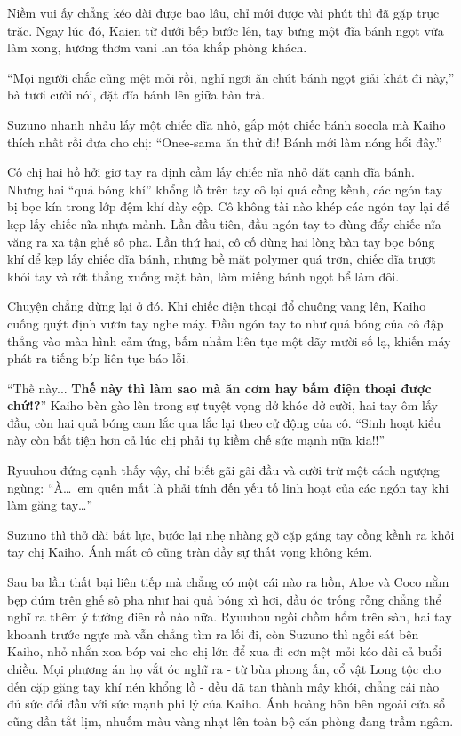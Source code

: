 ﻿\documentclass[../main.tex]{subfiles}
\begin{document}
Niềm vui ấy chẳng kéo dài được bao lâu, chỉ mới được vài phút thì đã gặp trục trặc. Ngay lúc đó, Kaien từ dưới bếp bước lên, tay bưng một đĩa bánh ngọt vừa làm xong, hương thơm vani lan tỏa khắp phòng khách.

``Mọi người chắc cũng mệt mỏi rồi, nghỉ ngơi ăn chút bánh ngọt giải khát đi này,'' bà tươi cười nói, đặt đĩa bánh lên giữa bàn trà.

Suzuno nhanh nhảu lấy một chiếc đĩa nhỏ, gắp một chiếc bánh socola mà Kaiho thích nhất rồi đưa cho chị: ``Onee-sama ăn thử đi! Bánh mới làm nóng hổi đây.''

Cô chị hai hồ hởi giơ tay ra định cầm lấy chiếc nĩa nhỏ đặt cạnh đĩa bánh. Nhưng hai ``quả bóng khí'' khổng lồ trên tay cô lại quá cồng kềnh, các ngón tay bị bọc kín trong lớp đệm khí dày cộp. Cô không tài nào khép các ngón tay lại để kẹp lấy chiếc nĩa nhựa mảnh. Lần đầu tiên, đầu ngón tay to đùng đẩy chiếc nĩa văng ra xa tận ghế sô pha. Lần thứ hai, cô cố dùng hai lòng bàn tay bọc bóng khí để kẹp lấy chiếc đĩa bánh, nhưng bề mặt polymer quá trơn, chiếc đĩa trượt khỏi tay và rớt thẳng xuống mặt bàn, làm miếng bánh ngọt bể làm đôi.

Chuyện chẳng dừng lại ở đó. Khi chiếc điện thoại đổ chuông vang lên, Kaiho cuống quýt định vươn tay nghe máy. Đầu ngón tay to như quả bóng của cô đập thẳng vào màn hình cảm ứng, bấm nhầm liên tục một dãy mười số lạ, khiến máy phát ra tiếng bíp liên tục báo lỗi.

``Thế này... \textbf{Thế này thì làm sao mà ăn cơm hay bấm điện thoại được chứ!?}'' Kaiho bèn gào lên trong sự tuyệt vọng dở khóc dở cười, hai tay ôm lấy đầu, còn hai quả bóng cam lắc qua lắc lại theo cử động của cô. ``Sinh hoạt kiểu này còn bất tiện hơn cả lúc chị phải tự kiềm chế sức mạnh nữa kia!!''

Ryuuhou đứng cạnh thấy vậy, chỉ biết gãi gãi đầu và cười trừ một cách ngượng ngùng: ``À\dots\ em quên mất là phải tính đến yếu tố linh hoạt của các ngón tay khi làm găng tay\dots''

Suzuno thì thở dài bất lực, bước lại nhẹ nhàng gỡ cặp găng tay cồng kềnh ra khỏi tay chị Kaiho. Ánh mắt cô cũng tràn đầy sự thất vọng không kém.

Sau ba lần thất bại liên tiếp mà chẳng có một cái nào ra hồn, Aloe và Coco nằm bẹp dúm trên ghế sô pha như hai quả bóng xì hơi, đầu óc trống rỗng chẳng thể nghĩ ra thêm ý tưởng điên rồ nào nữa. Ryuuhou ngồi chồm hổm trên sàn, hai tay khoanh trước ngực mà vẫn chẳng tìm ra lối đi, còn Suzuno thì ngồi sát bên Kaiho, nhỏ nhắn xoa bóp vai cho chị lớn để xua đi cơn mệt mỏi kéo dài cả buổi chiều. Mọi phương án họ vắt óc nghĩ ra - từ bùa phong ấn, cổ vật Long tộc cho đến cặp găng tay khí nén khổng lồ - đều đã tan thành mây khói, chẳng cái nào đủ sức đối đầu với sức mạnh phi lý của Kaiho. Ánh hoàng hôn bên ngoài cửa sổ cũng dần tắt lịm, nhuốm màu vàng nhạt lên toàn bộ căn phòng đang trầm ngâm.
\end{document}
